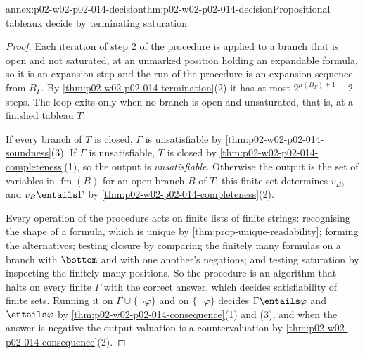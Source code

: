 \begin{annexitem}{annex:p02-w02-p02-014-decision}{thm:p02-w02-p02-014-decision}{Propositional tableaux decide by terminating saturation}
\begin{proof}
Each iteration of step 2 of the procedure is applied to a branch that is open
and not saturated, at an unmarked position holding an expandable formula, so
it is an expansion step and the run of the procedure is an expansion sequence
from \(B_\Gamma\).  By \cref{thm:p02-w02-p02-014-termination}(2) it has at
most \(2^{\mu(B_\Gamma)+1}-2\) steps.  The loop exits only when no branch is
open and unsaturated, that is, at a finished tableau \(T\).

If every branch of \(T\) is closed, \(\Gamma\) is unsatisfiable by
\cref{thm:p02-w02-p02-014-soundness}(3).  If \(\Gamma\) is unsatisfiable,
\(T\) is closed by \cref{thm:p02-w02-p02-014-completeness}(1), so the output
is \emph{unsatisfiable}.  Otherwise the output is the set of variables in
\(\operatorname{fm}(B)\) for an open branch \(B\) of \(T\); this finite set determines
\(v_B\), and \(v_B\entails\Gamma\) by
\cref{thm:p02-w02-p02-014-completeness}(2).

Every operation of the procedure acts on finite lists of finite strings:
recognising the shape of a formula, which is unique by
\cref{thm:prop-unique-readability}; forming the alternatives; testing
closure by comparing the finitely many formulas on a branch with \(\bottom\)
and with one another's negations; and testing saturation by inspecting the
finitely many positions.  So the procedure is an algorithm that halts on
every finite \(\Gamma\) with the correct answer, which decides
satisfiability of finite sets.  Running it on \(\Gamma\cup\{\neg\varphi\}\)
and on \(\{\neg\varphi\}\) decides \(\Gamma\entails\varphi\) and
\(\entails\varphi\) by \cref{thm:p02-w02-p02-014-consequence}(1) and (3), and
when the answer is negative the output valuation is a countervaluation by
\cref{thm:p02-w02-p02-014-consequence}(2).
\end{proof}
\end{annexitem}

